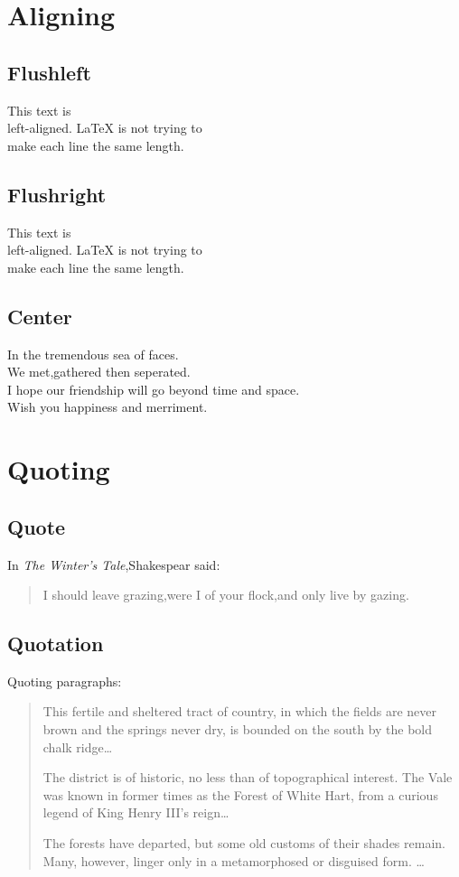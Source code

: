 \documentclass[a4paper]{report}
\begin{document}
\section{Aligning}

\subsection{Flushleft}
\begin{flushleft}
This text is\\ left-aligned. \LaTeX{} is not trying to\\ make each
line the same length.
\end{flushleft}

\subsection{Flushright}
\begin{flushright}
This text is\\ left-aligned. \LaTeX{} is not trying to\\ make each
line the same length.
\end{flushright}

\subsection{Center}
\begin{center}
In the tremendous sea of faces.\\
We met,gathered then seperated.\\
I hope our friendship will go beyond time and space.\\
Wish you
happiness and merriment.
\end{center}

\section{Quoting}
\subsection{Quote}
In \emph{The Winter's Tale},Shakespear said:
\begin{quote}
I should leave grazing,were I of your flock,and only live by gazing.
\end{quote}
\subsection{Quotation}
Quoting paragraphs:
\begin{quotation}
This fertile and sheltered tract of country, in which the fields are
never brown and the springs never dry, is bounded on the south by
the bold chalk ridge\ldots

The district is of historic, no less than of topographical interest.
The Vale was known in former times as the Forest of White Hart, from
a curious legend of King Henry III's reign\ldots

The forests have departed, but some old customs of their shades
remain. Many, however, linger only in a metamorphosed or disguised
form. \ldots
\end{quotation}
\end{document}
